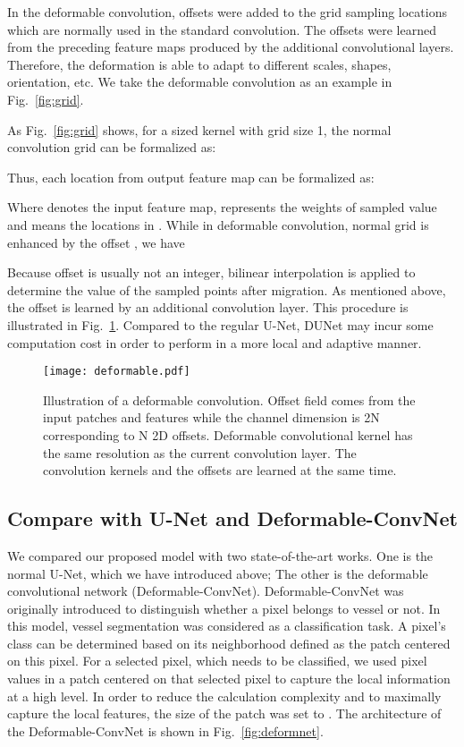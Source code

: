 \documentclass[journal]{IEEEtran}
\begin{document}
In the deformable convolution, offsets were added to the grid sampling locations which are normally used in the standard convolution. The offsets were learned from the preceding feature maps produced by the additional convolutional layers. Therefore, the deformation is able to adapt to different scales, shapes, orientation, etc. We take the  deformable convolution as an example in Fig.~\ref{fig:grid}.

As Fig.~\ref{fig:grid} shows, for a  sized kernel with grid size 1, the normal convolution grid  can be formalized as:
\setlength{\abovedisplayshortskip}{0pt}
\setlength{\belowdisplayshortskip}{0pt}


Thus, each location  from output feature map  can be formalized as:
\setlength{\abovedisplayshortskip}{0pt}
\setlength{\belowdisplayshortskip}{0pt}



Where  denotes the input feature map,  represents the weights of sampled value and  means the locations in . While in deformable convolution, normal grid  is enhanced by the offset , we have

\setlength{\abovedisplayshortskip}{0pt}
\setlength{\belowdisplayshortskip}{0pt}


Because offset  is usually not an integer, bilinear interpolation is applied to determine the value of the sampled points after migration. As mentioned above, the offset  is learned by an additional convolution layer. This procedure is illustrated in Fig.~\ref{fig:deformable}. Compared to the regular U-Net, DUNet may incur some computation cost in order to perform in a more local and adaptive manner.

\begin{figure}
\centering
\texttt{[image: deformable.pdf]}
\caption{Illustration of a  deformable convolution. Offset field comes from the input patches and features while the channel dimension is 2N corresponding to N 2D offsets. Deformable convolutional kernel has the same resolution as the current convolution layer. The convolution kernels and the offsets are learned at the same time.}
\label{fig:deformable}
\end{figure}


\subsection{Compare with U-Net and Deformable-ConvNet}
We compared our proposed model with two state-of-the-art works. One is the normal U-Net, which we have introduced above; The other is the deformable convolutional network (Deformable-ConvNet). Deformable-ConvNet was originally introduced to distinguish whether a pixel belongs to vessel or not. In this model, vessel segmentation was considered as a classification task. A pixel's class can be determined based on its neighborhood defined as the patch centered on this pixel. For a selected pixel, which needs to be classified, we used pixel values in a patch centered on that selected pixel to capture the local information at a high level. In order to reduce the calculation complexity and to maximally capture the local features, the size of the patch was set to . The architecture of the Deformable-ConvNet is shown in Fig.~\ref{fig:deformnet}.
\end{document}
